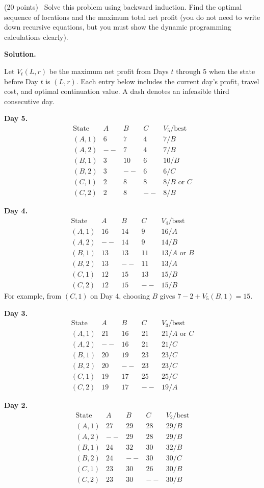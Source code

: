 \documentclass[11pt,letterpaper]{article}
\newenvironment{examquestion}[2]{%
  \clearpage
  \begin{list}{}{%
    \setlength{\leftmargin}{2.15em}%
    \setlength{\labelwidth}{1.55em}%
    \setlength{\labelsep}{0.60em}%
    \setlength{\itemindent}{0pt}%
    \setlength{\listparindent}{0pt}%
    \setlength{\parsep}{0.42em}%
    \setlength{\topsep}{0pt}%
  }
  \item[\hfill #1.] (#2 points)\ 
}{%
  \end{list}
}
\newenvironment{solution}{%
  \par\medskip
  \color{red}
  \noindent\textbf{Solution.}\par
}{%
  \par
  \color{black}
}
\begin{document}
\begin{examquestion}{4}{20}
Solve this problem using backward induction. Find the optimal sequence of locations
and the maximum total net profit (you do not need to write down recursive equations,
but you must show the dynamic programming calculations clearly).

\begin{solution}
Let $V_t(L,r)$ be the maximum net profit from Days $t$ through 5 when the state
before Day $t$ is $(L,r)$. Each entry below includes the current day's profit,
travel cost, and optimal continuation value. A dash denotes an infeasible third
consecutive day.

\begingroup
\small
\renewcommand{\arraystretch}{1.08}
\textbf{Day 5.}
\[
\begin{array}{c|rrr|c}
\text{State}&A&B&C&V_5/\text{best}\\ \hline
(A,1)&6&7&4&7/B\\
(A,2)&--&7&4&7/B\\
(B,1)&3&10&6&10/B\\
(B,2)&3&--&6&6/C\\
(C,1)&2&8&8&8/B\text{ or }C\\
(C,2)&2&8&--&8/B
\end{array}
\]

\textbf{Day 4.}
\[
\begin{array}{c|rrr|c}
\text{State}&A&B&C&V_4/\text{best}\\ \hline
(A,1)&16&14&9&16/A\\
(A,2)&--&14&9&14/B\\
(B,1)&13&13&11&13/A\text{ or }B\\
(B,2)&13&--&11&13/A\\
(C,1)&12&15&13&15/B\\
(C,2)&12&15&--&15/B
\end{array}
\]
For example, from $(C,1)$ on Day 4, choosing $B$ gives
$7-2+V_5(B,1)=15$.

\textbf{Day 3.}
\[
\begin{array}{c|rrr|c}
\text{State}&A&B&C&V_3/\text{best}\\ \hline
(A,1)&21&16&21&21/A\text{ or }C\\
(A,2)&--&16&21&21/C\\
(B,1)&20&19&23&23/C\\
(B,2)&20&--&23&23/C\\
(C,1)&19&17&25&25/C\\
(C,2)&19&17&--&19/A
\end{array}
\]

\textbf{Day 2.}
\[
\begin{array}{c|rrr|c}
\text{State}&A&B&C&V_2/\text{best}\\ \hline
(A,1)&27&29&28&29/B\\
(A,2)&--&29&28&29/B\\
(B,1)&24&32&30&32/B\\
(B,2)&24&--&30&30/C\\
(C,1)&23&30&26&30/B\\
(C,2)&23&30&--&30/B
\end{array}
\]


\end{solution}
\end{examquestion}
\end{document}
